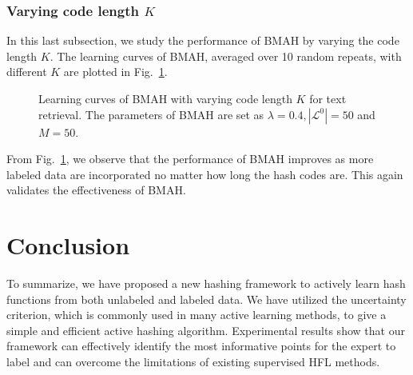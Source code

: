 \subsubsection{Varying code length $K$}

In this last subsection, we study the performance of \mbox{BMAH} by varying the code length $ K $. The learning curves of \mbox{BMAH}, averaged over 10 random repeats, with different $ K $ are plotted in Fig.~\ref{fig:apt-news-fullb}. %

\begin{figure}[htb]
{}
\caption{Learning curves of \mbox{BMAH} with varying code length $K$ for text retrieval. The parameters of \mbox{BMAH} are set as $\lambda=0.4,|\mathcal{L}^{0}|=50$ and $M = 50$.}
\label{fig:apt-news-fullb}
\end{figure}

From Fig.~\ref{fig:apt-news-fullb}, we observe that the performance of \mbox{BMAH} improves as more labeled data are incorporated no matter how long the hash codes are. This again validates the effectiveness of \mbox{BMAH}.

\section{Conclusion}
\label{AH:conclusion}
To summarize, we have proposed a new hashing framework to actively learn hash functions from both unlabeled and labeled data. We have utilized the uncertainty criterion, which is commonly used in many active learning methods, to give a simple and efficient active hashing algorithm. Experimental results show that our framework can effectively identify the most informative points for the expert to label and can overcome the limitations of existing supervised \mbox{HFL} methods. 

